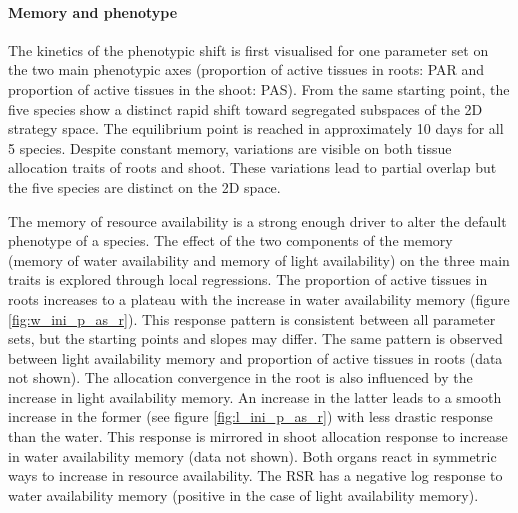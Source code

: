 \paragraph{Memory and phenotype}

The kinetics of the phenotypic shift is first visualised for one parameter set on the two main phenotypic axes (proportion of active tissues in roots: PAR and proportion of active tissues in the shoot: PAS). From the same starting point, the five species show a distinct rapid shift toward segregated subspaces of the 2D strategy space. The equilibrium point is reached in approximately 10 days for all 5 species. Despite constant memory, variations are visible on both tissue allocation traits of roots and shoot. These variations lead to partial overlap but the five species are distinct on the 2D space.

The memory of resource availability is a strong enough driver to alter the default phenotype of a species. The effect of the two components of the memory (memory of water availability and memory of light availability) on the three main traits is explored through local regressions. The proportion of active tissues in roots increases to a plateau with the increase in water availability memory (figure \ref{fig:w_ini_p_as_r}). This response pattern is consistent between all parameter sets, but the starting points and slopes may differ. The same pattern is observed between light availability memory and proportion of active tissues in roots (data not shown). The allocation convergence in the root is also influenced by the increase in light availability memory. An increase in the latter leads to a smooth increase in the former (see figure \ref{fig:l_ini_p_as_r}) with less drastic response than the water. This response is mirrored in shoot allocation response to increase in water availability memory (data not shown). Both organs react in symmetric ways to increase in resource availability. The RSR has a negative log response to water availability memory (positive in the case of light availability memory).

